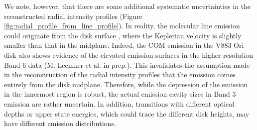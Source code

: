\documentclass[twocolumn, twocolappendix, astrosymb, times]{aastex631}
\newcommand{\methanol}{CH$_3$OH\xspace}
\begin{document}
We note, however, that there are some additional systematic uncertainties in the reconstructed radial intensity profiles (Figure \ref{fig:radial_profile_from_line_profile}). In reality, the molecular line emission could originate from the disk surface \citep[or the warm molecular layer,][]{Aikawa2002, Law2021, Law2022, Law2023, PanequeCarreno2023}, where the Keplerian velocity is slightly smaller than that in the midplane. Indeed, the COM emission in the V883 Ori disk also shows evidence of the elevated emission surfaces in the higher-resolution Band 6 data (M. Leemker et al. in prep.). This invalidates the assumption made in the reconstruction of the radial intensity profiles that the emission comes entirely from the disk midplane. Therefore, while the depression of the emission in the innermost region is robust, the actual emission cavity sizes in Band 3 emission are rather uncertain. In addition, transitions with different optical depths or upper state energies, which could trace the different disk heights, may have different emission distributions. 

\end{document}
